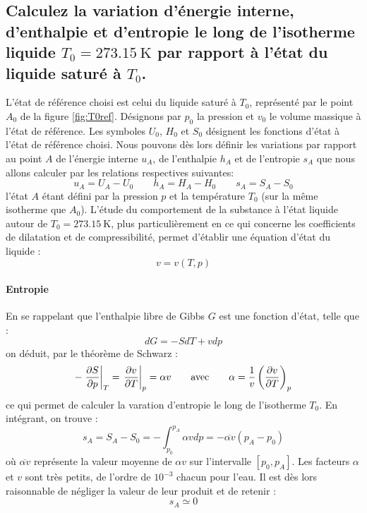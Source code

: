\subsection{Calculez la variation d'énergie interne, d'enthalpie et d'entropie le long de l'isotherme liquide $T_0 = \SI{273.15}{\kelvin}$ par rapport à l'état du liquide saturé à $T_0$.}
L'état de référence choisi est celui du liquide saturé à $T_0$, représenté par le point $A_0$ de la figure \ref{fig:T0ref}. Désignons par $p_0$ la pression et $v_0$ le volume massique à l'état de référence. Les symboles $U_0$, $H_0$ et $S_0$ désignent les fonctions d'état à l'état de référence choisi. Nous pouvons dès lors définir les variations par rapport au point $A$ de l'énergie interne $u_A$, de l'enthalpie $h_A$ et de l'entropie $s_A$ que nous allons calculer par les relations respectives suivantes:
\begin{equation} u_A = U_A-U_{0} \qquad h_A = H_A-H_{0} \qquad s_A = S_A-S_{0} \end{equation}
l'état $A$ étant défini par la pression $p$ et la température $T_0$ (sur la même isotherme que $A_0$). L'étude du comportement de la substance à l'état liquide autour de $T_0=\SI{273.15}{\kelvin}$, plus particulièrement en ce qui concerne les coefficients de dilatation et de compressibilité, permet d'établir une équation d'état du liquide :
\begin{equation} v = v(T,p) \end{equation}
\paragraph{Entropie} En se rappelant que l'enthalpie libre de Gibbs $G$ est une fonction d'état, telle que :
\begin{equation} dG = -SdT + vdp \end{equation}
on déduit, par le théorème de Schwarz :
\begin{equation} -\left.\dfrac{\partial S}{\partial p}\right|_T = \left.\dfrac{\partial v}{\partial T}\right|_p = \alpha v \qquad \text{avec} \qquad \alpha = \frac{1}{v}\left(\dfrac{\partial v}{\partial T}\right)_p \end{equation}
ce qui permet de calculer la varation d'entropie le long de l'isotherme $T_0$. En intégrant, on trouve :
\begin{equation} s_A = S_A-S_0 = -\int_{p_0}^{p_A}\alpha vdp = -\overline{\alpha v}(p_A-p_0) \end{equation}
où $\overline{\alpha v}$ représente la valeur moyenne de $\alpha v$ sur l'intervalle $\left[p_0,p_A\right]$. Les facteurs $\alpha$ et $v$ sont très petits, de l'ordre de $10^{-3}$ chacun pour l'eau. Il est dès lors raisonnable de négliger la valeur de leur produit et de retenir :
\begin{equation} s_A \simeq 0 \end{equation}
